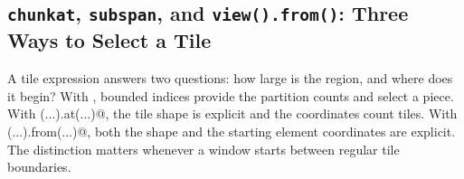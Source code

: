 \subsection*{\texttt{chunkat}, \texttt{subspan}, and \texttt{view().from()}: Three Ways to Select a Tile}

A tile expression answers two questions: how large is the region, and where does it begin? With \co@chunkat@, bounded indices provide the partition counts and select a piece. With \co@subspan(...).at(...)@, the tile shape is explicit and the coordinates count tiles. With \co@view(...).from(...)@, both the shape and the starting element coordinates are explicit. The distinction matters whenever a window starts between regular tile boundaries.
